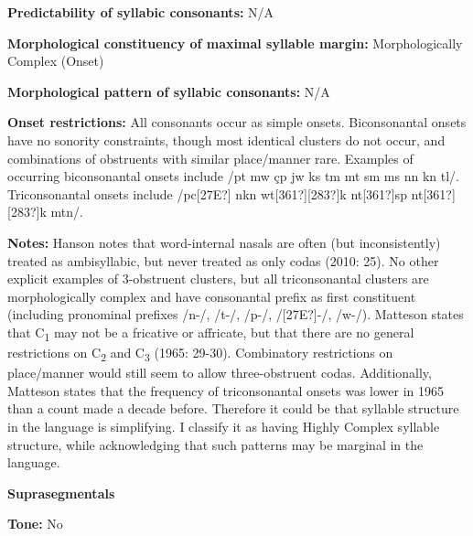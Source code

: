 \begin{styleBody}
\textbf{Predictability of syllabic consonants:} N/A
\end{styleBody}

\begin{styleBody}
\textbf{Morphological constituency of maximal syllable margin:} Morphologically Complex (Onset)
\end{styleBody}

\begin{styleBody}
\textbf{Morphological pattern of syllabic consonants:} N/A
\end{styleBody}

\begin{styleBody}
\textbf{Onset restrictions: }All consonants occur as simple onsets. Biconsonantal onsets have no sonority constraints, though most identical clusters do not occur, and combinations of obstruents with similar place/manner rare. Examples of occurring biconsonantal onsets include /pt mw çp jw ks tm mt sm ms nn kn tl/. Triconsonantal onsets include /pc[27E?] nkn wt[361?][283?]k nt[361?]sp nt[361?][283?]k mtn/.
\end{styleBody}

\begin{styleBody}
\textbf{Notes: }Hanson notes that word-internal nasals are often (but inconsistently) treated as ambisyllabic, but never treated as only codas (2010: 25). No other explicit examples of 3-obstruent clusters, but all triconsonantal clusters are morphologically complex and have consonantal prefix as first constituent (including pronominal prefixes /n-/, /t-/, /p-/, /[27E?]{}-/, /w-/). Matteson states that C\textsubscript{1} may not be a fricative or affricate, but that there are no general restrictions on C\textsubscript{2} and C\textsubscript{3 }(1965: 29-30). Combinatory restrictions on place/manner would still seem to allow three-obstruent codas. Additionally, Matteson states that the frequency of triconsonantal onsets was lower in 1965 than a count made a decade before. Therefore it could be that syllable structure in the language is simplifying. I classify it as having Highly Complex syllable structure, while acknowledging that such patterns may be marginal in the language.
\end{styleBody}

\begin{styleBody}
\textbf{Suprasegmentals}
\end{styleBody}

\begin{styleBody}
\textbf{Tone:} No
\end{styleBody}

